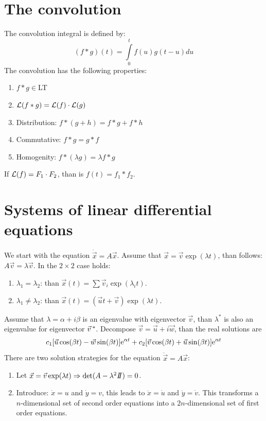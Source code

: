 \documentclass[twoside]{report}
\begin{document}
\section{The convolution}
The convolution integral is defined by:
\[
(f*g)(t)=\int\limits_0^tf(u)g(t-u)du
\]
The convolution has the following properties:
\begin{enumerate}
\item $f*g\in$LT
\item ${\cal L}(f*g)={\cal L}(f)\cdot{\cal L}(g)$
\item Distribution: $f*(g+h)=f*g+f*h$
\item Commutative: $f*g=g*f$
\item Homogenity: $f*(\lambda g)=\lambda f*g$
\end{enumerate}
If ${\cal L}(f)=F_1\cdot F_2$, than is $f(t)=f_1*f_2$.

\section{Systems of linear differential equations}
We start with the equation $\dot{\vec{x}}=A\vec{x}$. Assume that
$\vec{x}=\vec{v}\exp(\lambda t)$, than follows: $A\vec{v}=\lambda\vec{v}$.
In the $2\times2$ case holds:
\begin{enumerate}
\item $\lambda_1=\lambda_2$: than $\vec{x}(t)=\sum\vec{v}_i\exp(\lambda_it)$.
\item $\lambda_1\neq\lambda_2$: than $\vec{x}(t)=(\vec{u}t+\vec{v})\exp(\lambda t)$.
\end{enumerate}
Assume that $\lambda=\alpha+i\beta$ is an eigenvalue with eigenvector $\vec{v}$,
than $\lambda^*$ is also an eigenvalue for eigenvector $\vec{v}\,^*$. Decompose
$\vec{v}=\vec{u}+i\vec{w}$, than the real solutions are
\[
c_1[\vec{u}\cos(\beta t)-\vec{w}\sin(\beta t)]{\rm e}^{\alpha t}+c_2[\vec{v}\cos(\beta t)+\vec{u}\sin(\beta t)]{\rm e}^{\alpha t}
\]
\npar
There are two solution strategies for the equation $\ddot{\vec{x}}=A\vec{x}$:
\begin{enumerate}
\item Let $\vec{x}=\vec{v}\exp(\lambda t)\Rightarrow\det(A-\lambda^2I\hspace{-1mm}I)=0$.
\item Introduce: $\dot{x}=u$ and $\dot{y}=v$, this leads to $\ddot{x}=\dot{u}$ and
      $\ddot{y}=\dot{v}$. This transforms a $n$-dimensional set of second order
      equations into a $2n$-dimensional set of first order equations. 
\end{enumerate}
\end{document}
